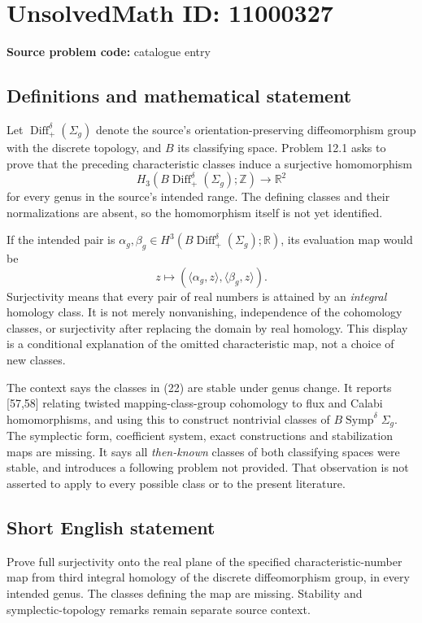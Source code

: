 \documentclass[11pt]{article}
\newcommand{\Z}{\mathbb{Z}}
\newcommand{\R}{\mathbb{R}}
\begin{document}
\section*{UnsolvedMath ID: 11000327}
\textbf{Source problem code:} catalogue entry
\subsection{Definitions and mathematical statement}
Let \(\operatorname{Diff}^{\delta}_+(\Sigma_g)\) denote the source's orientation-preserving diffeomorphism group with the discrete topology, and \(B\) its classifying space. Problem 12.1 asks to prove that the preceding characteristic classes induce a surjective homomorphism
\[
 H_3(B\operatorname{Diff}^{\delta}_+(\Sigma_g);\Z)
       \longrightarrow\R^2
\]
for every genus in the source's intended range. The defining classes and their normalizations are absent, so the homomorphism itself is not yet identified.

If the intended pair is \(\alpha_g,\beta_g\in H^3(B\operatorname{Diff}^{\delta}_+(\Sigma_g);\R)\), its evaluation map would be
\[
 z\longmapsto(\langle\alpha_g,z\rangle,\langle\beta_g,z\rangle).
\]
Surjectivity means that every pair of real numbers is attained by an \emph{integral} homology class. It is not merely nonvanishing, independence of the cohomology classes, or surjectivity after replacing the domain by real homology. This display is a conditional explanation of the omitted characteristic map, not a choice of new classes.

The context says the classes in (22) are stable under genus change. It reports [57,58] relating twisted mapping-class-group cohomology to flux and Calabi homomorphisms, and using this to construct nontrivial classes of \(B\operatorname{Symp}^{\delta}\Sigma_g\). The symplectic form, coefficient system, exact constructions and stabilization maps are missing. It says all \emph{then-known} classes of both classifying spaces were stable, and introduces a following problem not provided. That observation is not asserted to apply to every possible class or to the present literature.
\subsection{Short English statement}
Prove full surjectivity onto the real plane of the specified characteristic-number map from third integral homology of the discrete diffeomorphism group, in every intended genus. The classes defining the map are missing. Stability and symplectic-topology remarks remain separate source context.
\end{document}
